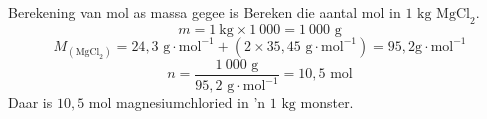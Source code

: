             \label{m38717*secfhsst!!!underscore!!!id641} 
      \begin{wex}{Berekening van mol as massa gegee is}
{
Bereken die aantal mol in $1\text{ kg}$ $\text{MgCl}_{2}$.
     }
{
\label{m38717*id278854}\nopagebreak\noindent{}
    \begin{equation*}
    m = 1~\text{kg} \times 1 ~000=1 ~000\text{ g}
      \end{equation*}
\label{m38717*id278912}\nopagebreak\noindent{}
    \begin{equation*}
    {M}_{(\text{MgCl}_{2})} = 24,3 \text{ g} \cdot \text{mol}^{-1} + (2 \times 35,45 \text{ g} \cdot \text{mol}^{-1}) = 95,2 \text{g} \cdot \text{mol}^{-1}
      \end{equation*}    
      \label{m38717*id279005}\nopagebreak\noindent{}
    \begin{equation*}
    n=\frac{1~000 \text{ g}}{95,2 \text{ g} \cdot \text{mol}^{-1}} = 10,5 \text{ mol}
      \end{equation*}
      \label{m38717*id279046}Daar is $10,5 \text{ mol}$ magnesiumchloried in  'n $1 \text{ kg}$ monster.
}
    \end{wex}
\label{m38717*secfhsst!!!underscore!!!id832}
